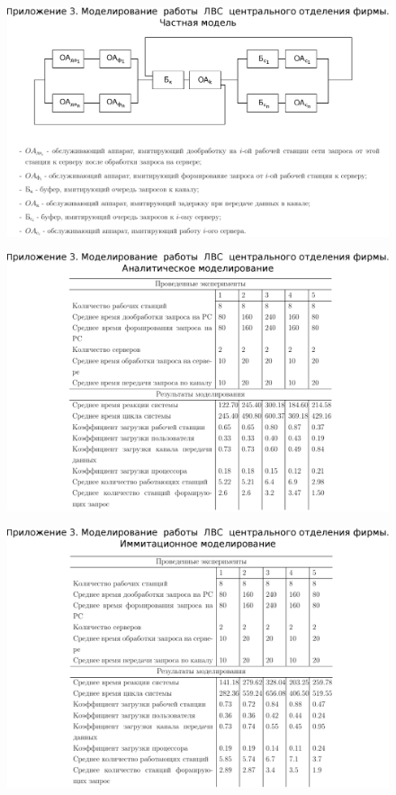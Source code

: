 \documentclass[russian,utf8,emptystyle]{eskdtext}
\begin{document}
\begin{landscape}
\clearpage
{}
\begin{figure}[h!]
\centering
\includegraphics[scale=0.9]{appendix/appendix_3_2}
\end{figure}

\clearpage
{}
\begin{figure}[h!]
\centering
\includegraphics[scale=0.9]{appendix/appendix_3_3}
\end{figure}

\clearpage
{}
\begin{figure}[h!]
\centering
\includegraphics[scale=0.9]{appendix/appendix_3_4}
\end{figure}


\end{landscape}
\end{document}
